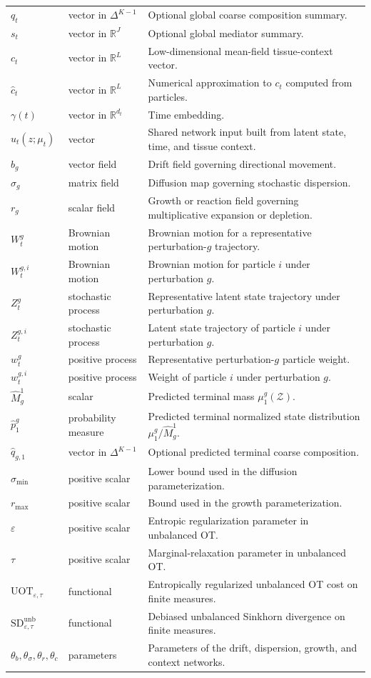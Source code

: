 \documentclass[11pt]{article}
\newcommand{\R}{\mathbb{R}}
\newcommand{\UOT}{\mathrm{UOT}}
\newcommand{\SDunb}{\mathrm{SD}^{\mathrm{unb}}}
\newcommand{\Zcal}{\mathcal{Z}}
\newcommand{\simplex}{\Delta}
\begin{document}
\begin{longtable}{p{}p{}p{}}
$q_t$ & vector in $\simplex^{K-1}$ & Optional global coarse composition summary.\\
$s_t$ & vector in $\R^J$ & Optional global mediator summary.\\
$c_t$ & vector in $\R^L$ & Low-dimensional mean-field tissue-context vector.\\
$\hat c_t$ & vector in $\R^L$ & Numerical approximation to $c_t$ computed from particles.\\
$\gamma(t)$ & vector in $\R^{d_t}$ & Time embedding.\\
$u_t(z;\mu_t)$ & vector & Shared network input built from latent state, time, and tissue context.\\
$b_g$ & vector field & Drift field governing directional movement.\\
$\sigma_g$ & matrix field & Diffusion map governing stochastic dispersion.\\
$r_g$ & scalar field & Growth or reaction field governing multiplicative expansion or depletion.\\
$W_t^g$ & Brownian motion & Brownian motion for a representative perturbation-$g$ trajectory.\\
$W_t^{g,i}$ & Brownian motion & Brownian motion for particle $i$ under perturbation $g$.\\
$Z_t^g$ & stochastic process & Representative latent state trajectory under perturbation $g$.\\
$Z_t^{g,i}$ & stochastic process & Latent state trajectory of particle $i$ under perturbation $g$.\\
$w_t^g$ & positive process & Representative perturbation-$g$ particle weight.\\
$w_t^{g,i}$ & positive process & Weight of particle $i$ under perturbation $g$.\\
$\hat M_g^1$ & scalar & Predicted terminal mass $\mu_1^g(\Zcal)$.\\
$\hat p_1^g$ & probability measure & Predicted terminal normalized state distribution $\mu_1^g/\hat M_g^1$.\\
$\hat q_{g,1}$ & vector in $\simplex^{K-1}$ & Optional predicted terminal coarse composition.\\
$\sigma_{\min}$ & positive scalar & Lower bound used in the diffusion parameterization.\\
$r_{\max}$ & positive scalar & Bound used in the growth parameterization.\\
$\varepsilon$ & positive scalar & Entropic regularization parameter in unbalanced OT.\\
$\tau$ & positive scalar & Marginal-relaxation parameter in unbalanced OT.\\
$\UOT_{\varepsilon,\tau}$ & functional & Entropically regularized unbalanced OT cost on finite measures.\\
$\SDunb_{\varepsilon,\tau}$ & functional & Debiased unbalanced Sinkhorn divergence on finite measures.\\
$\theta_b,\theta_\sigma,\theta_r,\theta_c$ & parameters & Parameters of the drift, dispersion, growth, and context networks.\\
\end{longtable}
\end{document}
